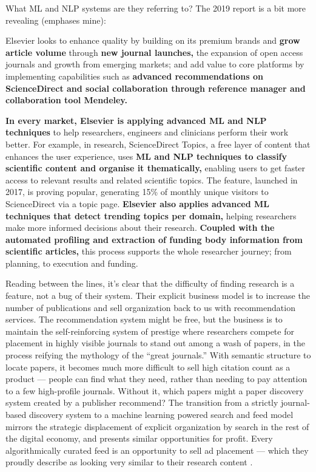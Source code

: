 What ML and NLP systems are they referring to? The 2019 report is a bit
more revealing (emphases mine):

\begin{leftbar}
Elsevier looks to enhance quality by building on its premium brands and
\textbf{grow article volume} through \textbf{new journal launches,} the
expansion of open access journals and growth from emerging markets; and
add value to core platforms by implementing capabilities such as
\textbf{advanced recommendations on ScienceDirect and social
collaboration through reference manager and collaboration tool
Mendeley.}

\textbf{In every market, Elsevier is applying advanced ML and NLP
techniques} to help researchers, engineers and clinicians perform their
work better. For example, in research, ScienceDirect Topics, a free
layer of content that enhances the user experience, uses \textbf{ML and
NLP techniques to classify scientific content and organise it
thematically,} enabling users to get faster access to relevant results
and related scientific topics. The feature, launched in 2017, is proving
popular, generating 15\% of monthly unique visitors to ScienceDirect via
a topic page. \textbf{Elsevier also applies advanced ML techniques that
detect trending topics per domain,} helping researchers make more
informed decisions about their research. \textbf{Coupled with the
automated profiling and extraction of funding body information from
scientific articles,} this process supports the whole researcher
journey; from planning, to execution and funding. \citep{RELXAnnualReport2019} 
\end{leftbar}

Reading between the lines, it's clear that the difficulty of finding
research is a feature, not a bug of their system. Their explicit
business model is to increase the number of publications and sell
organization back to us with recommendation services. The recommendation
system might be free, but the business is to maintain
the self-reinforcing system of prestige where researchers compete for
placement in highly visible journals to stand out among a wash of
papers, in the process reifying the mythology \citep{brembsPrestigiousScienceJournals2018}  of the ``great journals.''
With semantic structure to locate papers, it becomes much more difficult
to sell high citation count as a product --- people can find what they
need, rather than needing to pay attention to a few high-profile
journals. Without it, which papers might a paper discovery system
created by a publisher recommend? The transition from a strictly
journal-based discovery system to a machine learning powered search and
feed model mirrors the strategic displacement of explicit organization
by search in the rest of the digital economy, and presents similar
opportunities for profit. Every algorithmically curated feed is an
opportunity to sell ad placement --- which they
proudly describe as looking very similar to their research content \citep{springernatureBrandedContent, elsevier360AdvertisingSolutions} .

